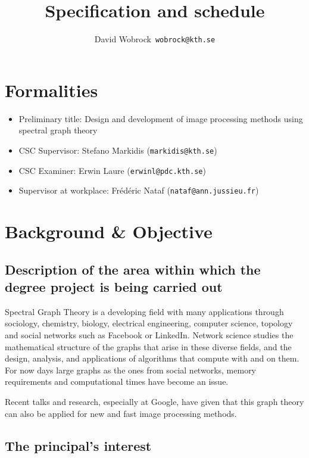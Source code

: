 \documentclass[12pt]{article}
\begin{document}
\title{Specification and schedule}
\author{David Wobrock\ \texttt{wobrock@kth.se}}

\maketitle

\section*{Formalities}

\begin{itemize}
 \item Preliminary title: Design and development of image processing methods using spectral graph theory
 \item CSC Supervisor: Stefano Markidis (\texttt{markidis@kth.se})
 \item CSC Examiner: Erwin Laure (\texttt{erwinl@pdc.kth.se})
 \item Supervisor at workplace: Fr\'{e}d\'{e}ric Nataf (\texttt{nataf@ann.jussieu.fr})
\end{itemize}

\section*{Background \& Objective}

\subsection*{Description of the area within which the degree project is being carried out}

Spectral Graph Theory is a developing field with many applications through sociology, chemistry, biology, electrical engineering, computer science, topology and social networks such as Facebook or LinkedIn.
Network science studies the mathematical structure of the graphs that arise in these diverse fields, and the design, analysis, and applications of algorithms that compute with and on them.
For now days large graphs as the ones from social networks, memory requirements and computational times have become an issue.

Recent talks and research, especially at Google, have given that this graph theory can also be applied for new and fast image processing methods.

\subsection*{The principal's interest}
\end{document}
